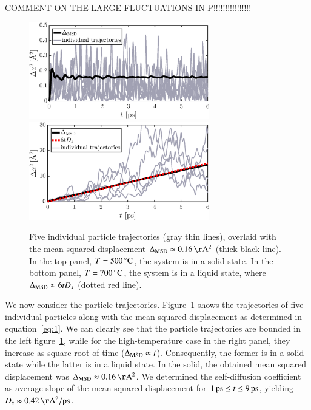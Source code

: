{\color{red} COMMENT ON THE LARGE FLUCTUATIONS IN P!!!!!!!!!!!!!!!!}

\begin{figure}[!ht]
\begin{center}
  \includegraphics[width=0.7\textwidth]{../figures/MSD-500}  \\
    \includegraphics[width=0.7\textwidth]{../figures/MSD-700} 
  \caption{Five individual particle trajectories (gray thin lines), overlaid with the mean squared displacement $\Delta_{\rm MSD} \approx \unit[0.16]{\AA^2}$ (thick black line). In the top panel, $T=\unit[500]{^\circ C}$, the system is in a solid state. In the bottom panel, $T=\unit[700]{^\circ C}$, the system is in a liquid state, where $\Delta_{\rm MSD} \approx 6 t D_s$ (dotted red line).}
  \label{fig:MSD}
\end{center}
\end{figure}
We now consider the particle trajectories. Figure~\ref{fig:MSD} shows the trajectories of five individual particles along with the mean squared displacement as determined in equation~\eqref{eq:1}. We can clearly see that the particle trajectories are bounded in the left figure~\ref{fig:MSD}, while for the high-temperature case in the right panel, they increase as square root of time ($\Delta_{\rm MSD} \propto t$). Consequently, the former is in a solid state while the latter is in a liquid state.  
In the solid, the obtained mean squared displacement was $\Delta_{\rm MSD} \approx \unit[0.16]{\AA^2}$.
We determined the self-diffusion coefficient as average slope of the mean squared displacement for $\unit[1]{ps} \leq t \leq \unit[9]{ps}$, yielding $D_s \approx \unit[0.42]{\AA^2/ps}$. 


